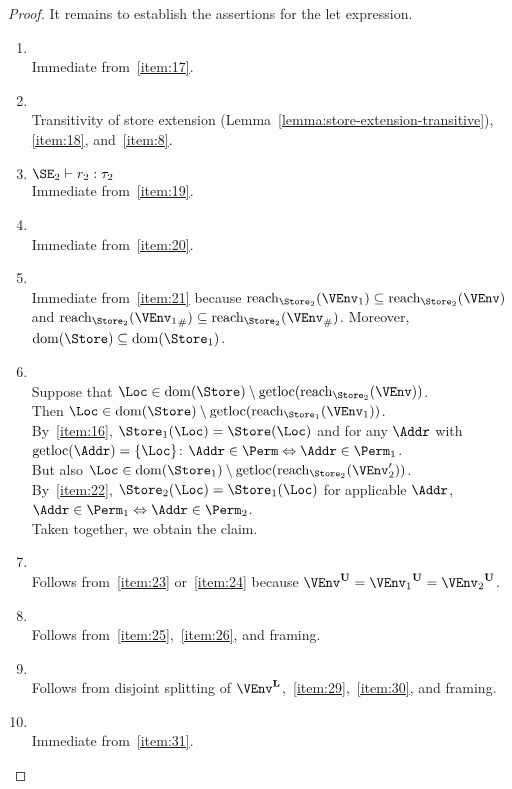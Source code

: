 \begin{proof}
  It remains to establish the assertions for the let expression.
  \begin{enumerate}[({R}-1)]
  \item {}
    \\ Immediate from~\ref{item:17}.
  \item {}
    \\ Transitivity of store extension
    (Lemma~\ref{lemma:store-extension-transitive}), \ref{item:18},
    and~\ref{item:8}.
  \item  $\SE_2 \vdash r_2 : \tau_2$
    \\ Immediate from~\ref{item:19}.
  \item {}
    \\ Immediate from~\ref{item:20}.
  \item {}
    \\ Immediate from~\ref{item:21}
    {because $\Reach{\Store_2}{\VEnv_1}
    \subseteq \Reach{\Store_2}{\VEnv} $ and
    $\Reach{\Store_2}{\Suspended{\VEnv_1}} \subseteq
    \Reach{\Store_2}{\Suspended\VEnv}$.
    Moreover, $\Dom\Store \subseteq \Dom{\Store_1}$.
  }
\item {}
    ~\\ Suppose that $\Loc \in \Dom\Store \setminus
    \Rawloc{\Reach{\Store_2}{\VEnv}}$.
    \\ Then $\Loc \in \Dom\Store \setminus
    \Rawloc{\Reach{\Store_1}{\VEnv_1}}$.
    \\ By~\ref{item:16}, $\Store_1 (\Loc) = \Store (\Loc)$ and for any
    $\Addr$ with $\Rawloc\Addr = \{\Loc\}$: $\Addr \in \Perm
    \Leftrightarrow \Addr \in \Perm_1$.
    \\ But also $\Loc \in \Dom{\Store_1} \setminus
    \Rawloc{\Reach{\Store_2}{\VEnv_2'}}$.
    \\ By~\ref{item:22}, $\Store_2 (\Loc) = \Store_1 (\Loc)$ for
    applicable $\Addr$, $\Addr \in \Perm_1
    \Leftrightarrow \Addr \in \Perm_2$.
    \\ Taken together, we obtain the claim.
  \item {}
    \\ Follows from~\ref{item:23} or~\ref{item:24} because
    $\ImmutableBorrows\VEnv = \ImmutableBorrows{\VEnv_1} =
    \ImmutableBorrows{\VEnv_2}$.
  \item {}
    \\ Follows from~\ref{item:25},~\ref{item:26}, and framing.
  \item {}
    \\ Follows from disjoint splitting of
    $\Active\VEnv$,~\ref{item:29},~\ref{item:30}, and framing.
  \item {}
    \\ Immediate from~\ref{item:31}.
  \end{enumerate}


\end{proof}
